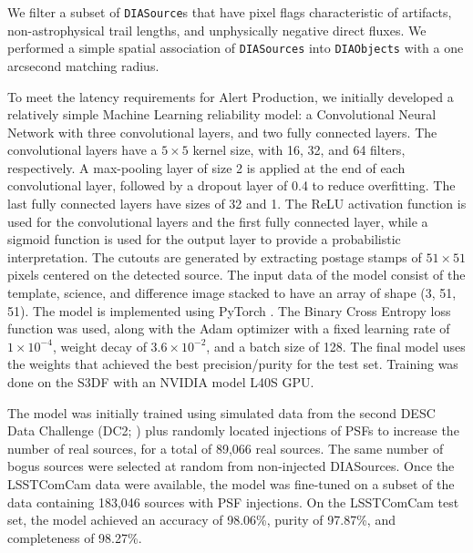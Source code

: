 We filter a subset of \texttt{DIASource}s that have pixel flags characteristic of artifacts, non-astrophysical trail lengths, and unphysically negative direct fluxes.
We performed a simple spatial association of \texttt{DIASources} into \texttt{DIAObjects} with a one arcsecond matching radius.

To meet the latency requirements for \gls{Alert Production}, we initially developed a relatively simple Machine Learning reliability model: a Convolutional Neural Network with three convolutional layers, and two fully connected layers.
The convolutional layers have a $5\times5$ kernel size, with 16, 32, and 64 filters, respectively.
A max-pooling layer of size 2 is applied at the end of each convolutional layer, followed by a dropout layer of 0.4 to reduce overfitting.
The last fully connected layers have sizes of 32 and 1.
The ReLU activation function is used for the convolutional layers and the first fully connected layer, while a sigmoid function is used for the output layer to provide a probabilistic interpretation.
The cutouts are generated by extracting postage stamps of $51\times51$ pixels centered on the detected source.
The input data of the model consist of the template, science, and difference image stacked to have an array of \gls{shape} (3, 51, 51).
The model is implemented using PyTorch \citep{10.1145/3620665.3640366}.
The Binary Cross Entropy loss function was used, along with the \gls{Adam} optimizer with a fixed learning rate of $1\times10^{-4}$, weight decay of $3.6\times10^{-2}$, and a batch size of 128.
The final model uses the weights that achieved the best precision/purity for the test set.
Training was done on the \gls{S3DF} with an NVIDIA model L40S GPU.

The model was initially trained using simulated data from the second \gls{DESC} Data Challenge (DC2; \citep{2021ApJS..253...31L}) plus randomly located injections of PSFs to increase the number of real sources, for a total of 89,066 real sources.
The same number of bogus sources were selected at random from non-injected DIASources.
Once the  \gls{LSSTComCam} data were available, the model was fine-tuned on a subset of the data containing 183,046 sources with PSF injections.
On the \gls{LSSTComCam} test set, the model achieved an accuracy of 98.06\%, purity of 97.87\%, and completeness of 98.27\%.

